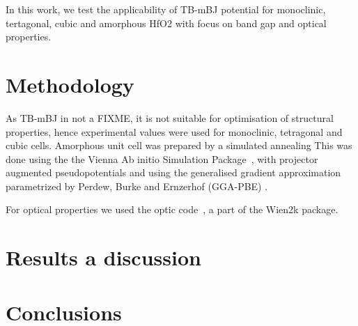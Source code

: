 \documentclass[10pt,a4paper,twocolumn]{article}
\begin{document}
In this work, we test the applicability of TB-mBJ potential for monoclinic, tertagonal, cubic and amorphous HfO2 with focus on band gap and optical properties.

\section{Methodology}

As TB-mBJ in not a FIXME, it is not suitable for optimisation of structural properties, hence experimental values were used for monoclinic, tetragonal and cubic cells. Amorphous unit cell was prepared by a simulated annealing  This was done using the the Vienna Ab initio Simulation Package~\cite{Kresse1996}, with projector augmented pseudopotentials \cite{Kresse1999} and using the generalised gradient approximation  parametrized by Perdew, Burke and Ernzerhof (GGA-PBE) \cite{Perdew1996}.


For optical properties we used the optic code~\cite{AmbroschDraxl2006}, a part of the Wien2k package.
 

\section{Results a discussion}

\section{Conclusions}



\end{document}
